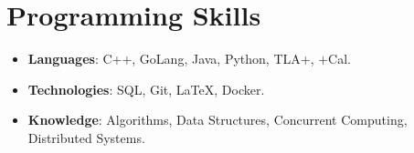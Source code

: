 \documentclass[letterpaper,10pt]{article}
\newcommand{\resumeSubHeadingListStart}{\begin{itemize}[leftmargin=*]}
\newcommand{\resumeSubHeadingListEnd}{\end{itemize}}
\begin{document}
\section{Programming Skills}
 \resumeSubHeadingListStart
   \item{
     \textbf{Languages}{: C++, GoLang, Java, Python, TLA+, +Cal. }
   }\vspace{-7pt}
   \item{
     \textbf{Technologies}{: SQL, Git, \LaTeX, Docker. }
   }
   \vspace{-7pt}
   \item{
     \textbf{Knowledge}{: Algorithms, Data Structures, Concurrent Computing, Distributed Systems.}
   }
 \resumeSubHeadingListEnd


\end{document}
